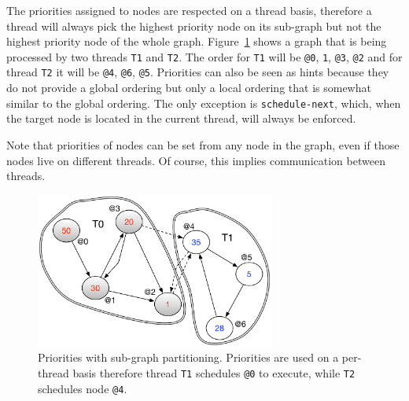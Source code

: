 The priorities assigned to nodes are respected on a thread basis, therefore a
thread will always pick the highest priority node on its sub-graph but not the
highest priority node of the whole graph.
Figure~\ref{fig:coordination:priorities} shows a graph that is being processed
by two threads \texttt{T1} and \texttt{T2}. The order for \texttt{T1} will be
\texttt{@0}, \texttt{1}, \texttt{@3}, \texttt{@2} and for thread \texttt{T2} it
will be \texttt{@4}, \texttt{@6}, \texttt{@5}.  Priorities can also be seen as
hints because they do not provide a global ordering but only a local ordering
that is somewhat similar to the global ordering. The only exception is
\texttt{schedule-next}, which, when the target node is located in the current
thread, will always be enforced.

Note that priorities of nodes can be set from any node in the graph, even if those nodes
live on different threads. Of course, this implies communication between
threads.

\begin{figure}
\begin{center}
   \includegraphics[width=0.7\textwidth]{figures/coordination/priorities.pdf}
\end{center}
\caption{Priorities with sub-graph partitioning. Priorities are used on a
   per-thread basis therefore thread \texttt{T1} schedules \texttt{@0} to
   execute, while \texttt{T2} schedules node \texttt{@4}.}
\label{fig:coordination:priorities}
\end{figure}
